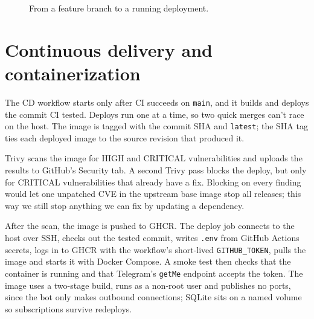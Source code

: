 \documentclass[11pt,a4paper]{article}
\begin{document}
\begin{figure}[h]
\centering
{}
\caption{From a feature branch to a running deployment.}
\label{fig:pipeline}
\end{figure}

\section{Continuous delivery and containerization}

The CD workflow starts only after CI succeeds on \texttt{main}, and it builds and deploys the commit CI tested. Deploys run one at a time, so two quick merges can't race on the host. The image is tagged with the commit SHA and \texttt{latest}; the SHA tag ties each deployed image to the source revision that produced it.

Trivy scans the image for HIGH and CRITICAL vulnerabilities and uploads the results to GitHub's Security tab. A second Trivy pass blocks the deploy, but only for CRITICAL vulnerabilities that already have a fix. Blocking on every finding would let one unpatched CVE in the upstream base image stop all releases; this way we still stop anything we can fix by updating a dependency.

After the scan, the image is pushed to GHCR. The deploy job connects to the host over SSH, checks out the tested commit, writes \texttt{.env} from GitHub Actions secrets, logs in to GHCR with the workflow's short-lived \texttt{GITHUB\_TOKEN}, pulls the image and starts it with Docker Compose. A smoke test then checks that the container is running and that Telegram's \texttt{getMe} endpoint accepts the token. The image uses a two-stage build, runs as a non-root user and publishes no ports, since the bot only makes outbound connections; SQLite sits on a named volume so subscriptions survive redeploys.
\end{document}
